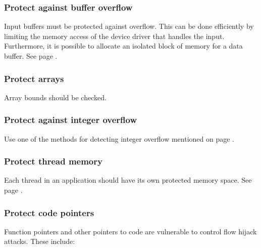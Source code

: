 \documentclass[forwardcom.tex]{subfiles}
\begin{document}
\subsubsection{Protect against buffer overflow}
Input buffers must be protected against overflow. This can be done efficiently by limiting the memory access of the device driver that handles the input. Furthermore, it is possible to allocate an isolated block of memory for a data buffer. See page \pageref{isolatedMemoryBlocks}.

\subsubsection{Protect arrays} Array bounds should be checked.

\subsubsection{Protect against integer overflow} Use one of the methods for detecting integer overflow mentioned on page \pageref{integerOverflowDetection}.

\subsubsection{Protect thread memory} Each thread in an application should have its own protected memory space. See page \pageref{threadMemoryProtection}.

\subsubsection{Protect code pointers}
Function pointers and other pointers to code are vulnerable to control flow hijack attacks. These include:
\end{document}

